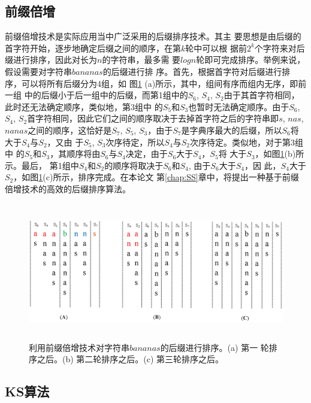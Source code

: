 \subsection{前缀倍增}

前缀倍增技术\cite{Manber1993}是实际应用当中广泛采用的后缀排序技术。其主
要思想是由后缀的首字符开始，逐步地确定后缀之间的顺序，在第$k$轮中可以根
据前$2^k$个字符来对后缀进行排序，因此对长为$n$的字符串，最多需
要$logn$轮即可完成排序。举例来说，假设需要对字符串$bananas$的后缀进行排
序。首先，根据首字符对后缀进行排序，可以将所有后缀分为4组，如
图\ref{fig:Prefix_Doubling} (a)所示，其中，组间有序而组内无序，即前一组
中的后缀小于后一组中的后缀，而第1组中的$S_6$, $S_4$,
$S_2$由于其首字符相同，此时还无法确定顺序，类似地，第3组中
的$S_5$和$S_3$也暂时无法确定顺序。由于$S_6$, $S_4$,
$S_2$首字符相同，因此它们之间的顺序取决于去掉首字符之后的字符串即$s$,
$nas$, $nanas$之间的顺序，这恰好是$S_7$, $S_5$,
$S_3$，由于$S_7$是字典序最大的后缀，所以$S_6$将大于$S_4$与$S_2$，又由
于$S_5$,
$S_3$次序待定，所以$S_4$与$S_2$次序待定。类似地，对于第3组中
的$S_5$和$S_3$，其顺序将由$S_6$与$S_4$决定，由于$S_6$大于$S_4$，$S_5$将
大于$S_3$，如图\ref{fig:Prefix_Doubling}(b)所示。最后，
第1组中$S_4$和$S_2$的顺序将取决于$S_6$和$S_4$, 由于$S_6$大于$S_4$，因
此，$S_4
$大于$S_2$，如图\ref{fig:Prefix_Doubling}(c)所示，排序完成。在本论文
第\ref{chap:SS}章中，将提出一种基于前缀倍增技术的高效的后缀排序算法。

\begin{figure}[H]
  \centering
  \includegraphics[height=6cm ,width=15cm]{figures/1_Introduction/Prefix_Doubling.eps}
  \caption{利用前缀倍增技术对字符串$bananas$的后缀进行排序。(a) 第一
    轮排序之后。(b) 第二轮排序之后。(c) 第三轮排序之后。}
  \label{fig:Prefix_Doubling}
\end{figure}

\subsection{KS算法}
\label{sec:KA}

